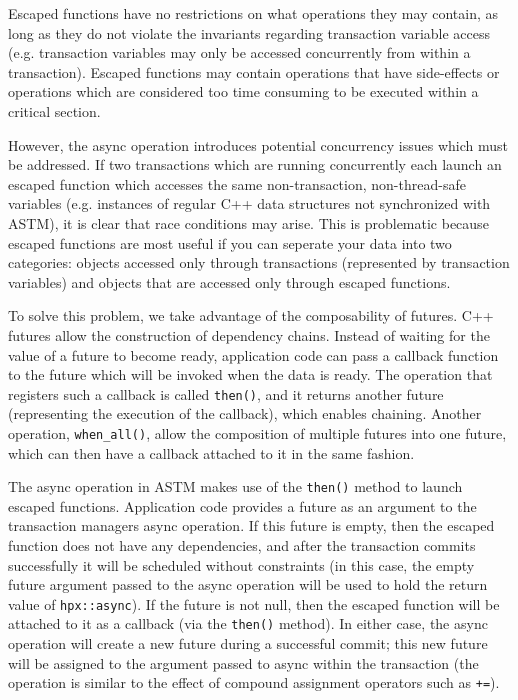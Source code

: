 \documentclass[conference]{IEEEtran}
\begin{document}
Escaped functions have no restrictions on what operations they may contain, as long as they do not violate the invariants regarding transaction variable access (e.g. transaction variables may only be accessed concurrently from within a transaction). Escaped functions may contain operations that have side-effects or operations which are considered too time consuming to be executed within a critical section.

However, the async operation introduces potential concurrency issues which must be addressed. If two transactions which are running concurrently each launch an escaped function which accesses the same non-transaction, non-thread-safe variables (e.g. instances of regular C++ data structures not synchronized with ASTM), it is clear that race conditions may arise. This is problematic because escaped functions are most useful if you can seperate your data into two categories: objects accessed only through transactions (represented by transaction variables) and objects that are accessed only through escaped functions.

To solve this problem, we take advantage of the composability of futures. C++ futures allow the construction of dependency chains. Instead of waiting for the value of a future to become ready, application code can pass a callback function to the future which will be invoked when the data is ready. The operation that registers such a callback is called \lstinline$then()$, and it returns another future (representing the execution of the callback), which enables chaining. Another operation, \lstinline$when_all()$, allow the composition of multiple futures into one future, which can then have a callback attached to it in the same fashion.

The async operation in ASTM makes use of the \lstinline$then()$ method to launch escaped functions. Application code provides a future as an argument to the transaction managers async operation. If this future is empty, then the escaped function does not have any dependencies, and after the transaction commits successfully it will be scheduled without constraints (in this case, the empty future argument passed to the async operation will be used to hold the return value of \lstinline$hpx::async$). If the future is not null, then the escaped function will be attached to it as a callback (via the \lstinline$then()$ method). In either case, the async operation will create a new future during a successful commit; this new future will be assigned to the argument passed to async within the transaction (the operation is similar to the effect of compound assignment operators such as \lstinline$+=$).
\end{document}
